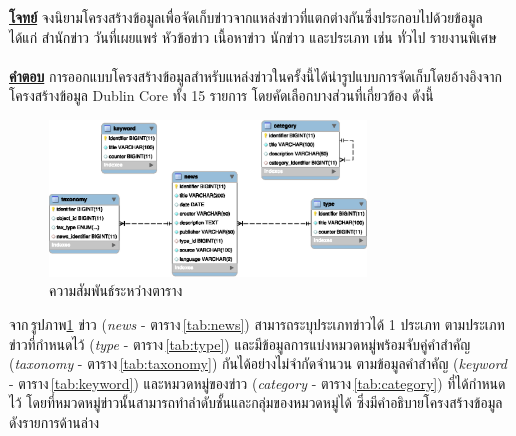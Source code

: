 \documentclass[16pt,a4paper]{article}
\renewcommand{\tablename}{ตาราง}
\renewcommand{\figurename}{รูปภาพ}
\begin{document}
\noindent
\textbf{\underline{โจทย์}} จงนิยามโครงสร้างข้อมูลเพื่อจัดเก็บข่าวจากแหล่งข่าวที่แตกต่างกันซึ่งประกอบไปด้วยข้อมูล ได้แก่ สำนักข่าว วันที่เผยแพร่ หัวข้อข่าว เนื้อหาข่าว นักข่าว และประเภท เช่น ทั่วไป รายงานพิเศษ \\ \\
\textbf{\underline{คำตอบ}} การออกแบบโครงสร้างข้อมูลสำหรับแหล่งข่าวในครั้งนี้ได้นำรูปแบบการจัดเก็บโดยอ้างอิงจากโครงสร้างข้อมูล Dublin Core \cite{dublincore} ทั้ง 15 รายการ โดยคัดเลือกบางส่วนที่เกี่ยวข้อง ดังนี้ 

\begin{figure}[!htb]
    \centering
    \includegraphics[width=0.75\textwidth]{fig/news-structure}
    \caption{ความสัมพันธ์ระหว่างตาราง}
    \label{fig:erdiagram}
\end{figure}

จาก\,\figurename \ref{fig:erdiagram} ข่าว (\textit{news} - \tablename\,\ref{tab:news}) สามารถระบุประเภทข่าวได้ 1 ประเภท ตามประเภทข่าวที่กำหนดไว้ (\textit{type} - \tablename\,\ref{tab:type}) 
และมีข้อมูลการแบ่งหมวดหมู่พร้อมจับคู่คำสำคัญ (\textit{taxonomy} - \tablename\,\ref{tab:taxonomy}) กันได้อย่างไม่จำกัดจำนวน ตามข้อมูลคำสำคัญ (\textit{keyword} - \tablename\,\ref{tab:keyword}) 
และหมวดหมู่ของข่าว (\textit{category} - \tablename\,\ref{tab:category}) ที่ได้กำหนดไว้ โดยที่หมวดหมู่ข่าวนั้นสามารถทำลำดับชั้นและกลุ่มของหมวดหมู่ได้ ซึ่งมีคำอธิบายโครงสร้างข้อมูลดังรายการด้านล่าง
\end{document}
